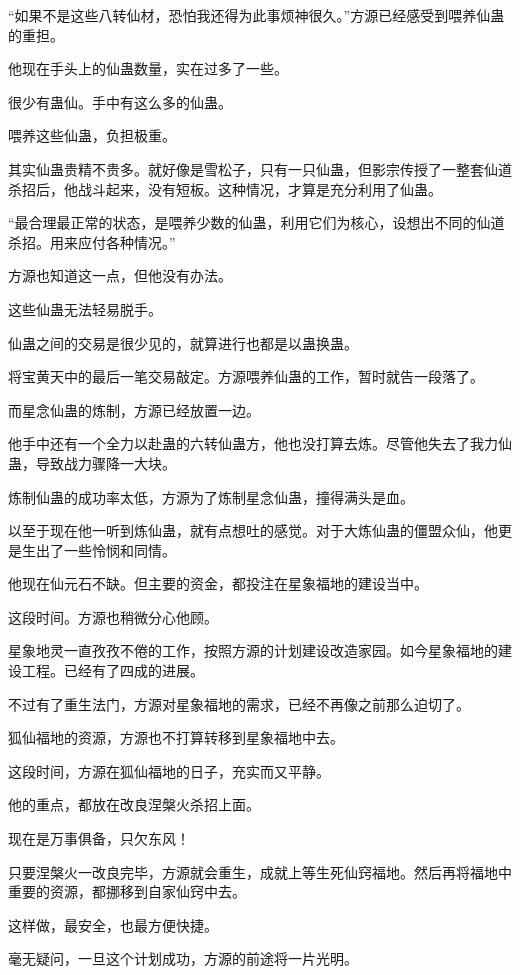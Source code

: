 \begin{this_body}
“如果不是这些八转仙材，恐怕我还得为此事烦神很久。”方源已经感受到喂养仙蛊的重担。

他现在手头上的仙蛊数量，实在过多了一些。

很少有蛊仙。手中有这么多的仙蛊。

喂养这些仙蛊，负担极重。

其实仙蛊贵精不贵多。就好像是雪松子，只有一只仙蛊，但影宗传授了一整套仙道杀招后，他战斗起来，没有短板。这种情况，才算是充分利用了仙蛊。

“最合理最正常的状态，是喂养少数的仙蛊，利用它们为核心，设想出不同的仙道杀招。用来应付各种情况。”

方源也知道这一点，但他没有办法。

这些仙蛊无法轻易脱手。

仙蛊之间的交易是很少见的，就算进行也都是以蛊换蛊。

将宝黄天中的最后一笔交易敲定。方源喂养仙蛊的工作，暂时就告一段落了。

而星念仙蛊的炼制，方源已经放置一边。

他手中还有一个全力以赴蛊的六转仙蛊方，他也没打算去炼。尽管他失去了我力仙蛊，导致战力骤降一大块。

炼制仙蛊的成功率太低，方源为了炼制星念仙蛊，撞得满头是血。

以至于现在他一听到炼仙蛊，就有点想吐的感觉。对于大炼仙蛊的僵盟众仙，他更是生出了一些怜悯和同情。

他现在仙元石不缺。但主要的资金，都投注在星象福地的建设当中。

这段时间。方源也稍微分心他顾。

星象地灵一直孜孜不倦的工作，按照方源的计划建设改造家园。如今星象福地的建设工程。已经有了四成的进展。

不过有了重生法门，方源对星象福地的需求，已经不再像之前那么迫切了。

狐仙福地的资源，方源也不打算转移到星象福地中去。

这段时间，方源在狐仙福地的日子，充实而又平静。

他的重点，都放在改良涅槃火杀招上面。

现在是万事俱备，只欠东风！

只要涅槃火一改良完毕，方源就会重生，成就上等生死仙窍福地。然后再将福地中重要的资源，都挪移到自家仙窍中去。

这样做，最安全，也最方便快捷。

毫无疑问，一旦这个计划成功，方源的前途将一片光明。


\end{this_body}
